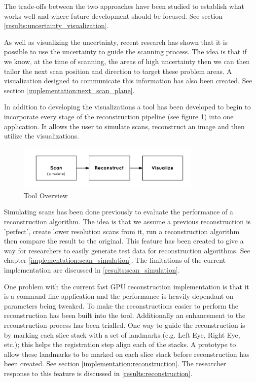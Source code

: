 The trade-offs between the two approaches have been studied to establish what works well and where future development should be focused. See section \ref{results:uncertainty_visualization}.

As well as visualizing the uncertainty, recent research\cite{uncertaintysvd} has shown that it is possible to use the uncertainty to guide the scanning process. The idea is that if we know, at the time of scanning, the areas of high uncertainty then we can then tailor the next scan position and direction to target these problem areas. A visualization designed to communicate this information has also been created. See section \ref{implementation:next_scan_plane}.

In addition to developing the visualizations a tool has been developed to begin to incorporate every stage of the reconstruction pipeline (see figure \ref{fig:tool_overview}) into one application. It allows the user to simulate scans, reconstruct an image and then utilize the visualizations.

\begin{figure}[h]
    \centering
  \includegraphics[width=0.8\textwidth]{images/tool_overview.png}
    \caption{Tool Overview}\label{fig:tool_overview}
\end{figure}

Simulating scans has been done previously to evaluate the performance of a reconstruction algorithm\cite{uncertaintysvd}. The idea is that we  assume a previous reconstruction is 'perfect', create lower resolution scans from it, run a reconstruction algorithm then compare the result to the original. This feature has been created to give a way for researchers to easily generate test data for reconstruction algorithms. See chapter \ref{implementation:scan_simulation}. The limitations of the current implementation are discussed in \ref{results:scan_simulation}.

One problem with the current fast GPU reconstruction implementation\cite{gpureconstruction} is that it is a command line application and the performance is heavily dependant on parameters being tweaked. To make the reconstructions easier to perform the reconstruction has been built into the tool. Additionally an enhancement to the reconstruction process has been trialled. One way to guide the reconstruction is by marking each slice stack with a set of landmarks (e.g. Left Eye, Right Eye, etc.); this helps the registration step align each of the stacks. A prototype to allow these landmarks to be marked on each slice stack before reconstruction has been created. See section \ref{implementation:reconstruction}. The researcher response to this feature is discussed in \ref{results:reconstruction}.